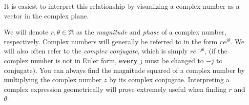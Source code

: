 \documentclass[a4paper]{article}
\numberwithin{equation}{section}
\begin{document}
It is easiest to interpret this relationship by visualizing a complex number as a vector in the complex plane. 
\begin{center}
\end{center}

We will denote $r, \theta \in \Re$ as the \textit{magnitude} and \textit{phase} of a complex number, respectively. Complex numbers will generally be referred to in the form $re^{j\theta}$. We will also often refer to the \textit{complex conjugate}, which is simply $re^{-j\theta}$, (if the complex number is not in Euler form, \textbf{every} $j$ must be changed to $-j$ to conjugate). You can always find the magnitude squared of a complex number by multiplying the complex number $z$ by its complex conjugate. Interpreting a complex expression geometrically will prove extremely useful when finding $r$ and $\theta$. \\
\bigskip
\end{document}
